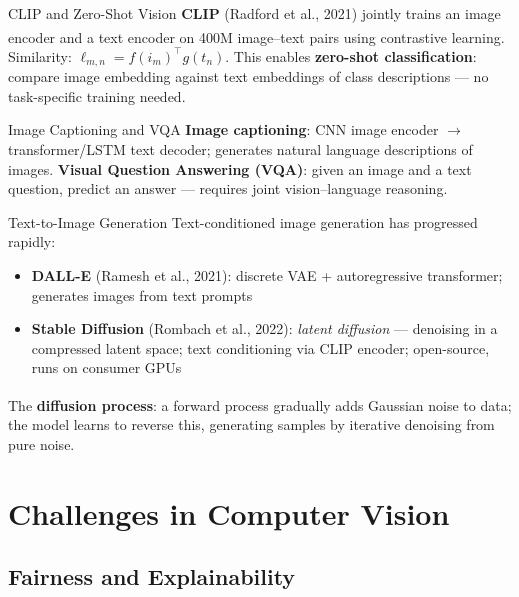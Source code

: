 \begin{v3topic}{CLIP and Zero-Shot Vision}
    \textbf{CLIP} (Radford et al., 2021) jointly trains an image encoder and a text encoder on 400M image--text pairs using contrastive learning\textsuperscript{\cite[][pp.~115--117]{fleuretLittleBookDeep}}.
    Similarity: $\ell_{m,n} = f(i_m)^\top g(t_n)$.
    This enables \textbf{zero-shot classification}: compare image embedding against text embeddings of class descriptions --- no task-specific training needed.

\end{v3topic}
\begin{v3topic}{Image Captioning and VQA}
    \textbf{Image captioning}: CNN image encoder $\to$ transformer/LSTM text decoder; generates natural language descriptions of images.
    \textbf{Visual Question Answering (VQA)}: given an image and a text question, predict an answer --- requires joint vision--language reasoning.

\end{v3topic}
\begin{v3topic}{Text-to-Image Generation}
    Text-conditioned image generation has progressed rapidly:
    \begin{itemize}
        \item \textbf{DALL-E} (Ramesh et al., 2021): discrete VAE + autoregressive transformer; generates images from text prompts
        \item \textbf{Stable Diffusion} (Rombach et al., 2022): \emph{latent diffusion} --- denoising in a compressed latent space; text conditioning via CLIP encoder; open-source, runs on consumer GPUs
    \end{itemize}
    The \textbf{diffusion process}\textsuperscript{\cite[][pp.~121--123]{fleuretLittleBookDeep}}: a forward process gradually adds Gaussian noise to data; the model learns to reverse this, generating samples by iterative denoising from pure noise.
\end{v3topic}


\section{Challenges in Computer Vision}

\subsection{Fairness and Explainability}

